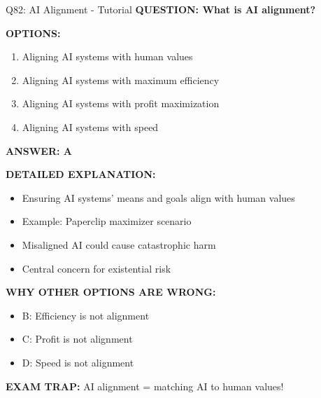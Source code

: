 \documentclass[8pt]{beamer}
\begin{document}
	\begin{frame}{Q82: AI Alignment - Tutorial}
		\fontsize{6.5}{7.5}\selectfont
		\textbf{QUESTION: What is AI alignment?}
		
		\vspace{0.1cm}
		\textbf{OPTIONS:}
		\begin{enumerate}
			\item Aligning AI systems with human values
			\item Aligning AI systems with maximum efficiency
			\item Aligning AI systems with profit maximization
			\item Aligning AI systems with speed
		\end{enumerate}
		
		\vspace{0.1cm}
		\textcolor{myblue}{\textbf{ANSWER: A}}
		
		\vspace{0.1cm}
		\textbf{DETAILED EXPLANATION:}
		\begin{itemize}
			\item Ensuring AI systems' means and goals align with human values
			\item Example: Paperclip maximizer scenario
			\item Misaligned AI could cause catastrophic harm
			\item Central concern for existential risk
		\end{itemize}
		
		\vspace{0.1cm}
		\textcolor{myred}{\textbf{WHY OTHER OPTIONS ARE WRONG:}}
		\begin{itemize}
			\item \textcolor{myred}{B:} Efficiency is not alignment
			\item \textcolor{myred}{C:} Profit is not alignment
			\item \textcolor{myred}{D:} Speed is not alignment
		\end{itemize}
		
		\textcolor{myred}{\textbf{EXAM TRAP:}} AI alignment = \textcolor{myblue}{matching AI to human values}!
	\end{frame}
	
\end{document}
